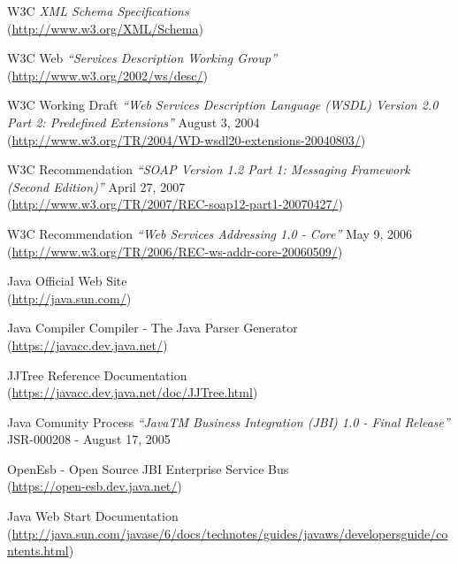 \begin{thebibliography}{99}
 W3C \emph{XML Schema Specifications}\\
(\href{http://www.w3.org/XML/Schema}{http://www.w3.org/XML/Schema})

 W3C Web \emph{``Services Description Working Group''}\\
(\href{http://www.w3.org/2002/ws/desc/}{http://www.w3.org/2002/ws/desc/})

 W3C Working Draft \emph{``Web Services Description
Language (WSDL) Version 2.0 Part 2: Predefined Extensions''} August 3, 2004 \\
(\href{http://www.w3.org/TR/2004/WD-wsdl20-extensions-20040803/}{http://www.w3.org/TR/2004/WD-wsdl20-extensions-20040803/})


 W3C Recommendation \emph{``SOAP Version 1.2 Part 1: Messaging
Framework (Second Edition)''} April 27, 2007\\
(\href{http://www.w3.org/TR/2007/REC-soap12-part1-20070427/}{http://www.w3.org/TR/2007/REC-soap12-part1-20070427/})

  W3C Recommendation \emph{``Web Services Addressing 1.0
- Core''} May 9, 2006 \\
(\href{http://www.w3.org/TR/2006/REC-ws-addr-core-20060509/}{http://www.w3.org/TR/2006/REC-ws-addr-core-20060509/})

 Java Official Web Site \\ 
(\href{http://java.sun.com/}{http://java.sun.com/})

 Java Compiler Compiler - The Java Parser
Generator \\ (\href{https://javacc.dev.java.net/}{https://javacc.dev.java.net/})

 JJTree Reference Documentation\\
(\href{https://javacc.dev.java.net/doc/JJTree.html}{https://javacc.dev.java.net/doc/JJTree.html})

 Java Comunity Process \emph{``JavaTM Business Integration (JBI)
1.0 - Final Release''} JSR-000208 - August 17, 2005

 OpenEsb - Open Source JBI Enterprise Service Bus \\
(\href{https://open-esb.dev.java.net/}{https://open-esb.dev.java.net/})

 Java Web Start Documentation \\
(\href{http://java.sun.com/javase/6/docs/technotes/guides/javaws/developersguide/contents.html}{http://java.sun.com/javase/6/docs/technotes/guides/javaws/developersguide/contents.html})


\end{thebibliography}
